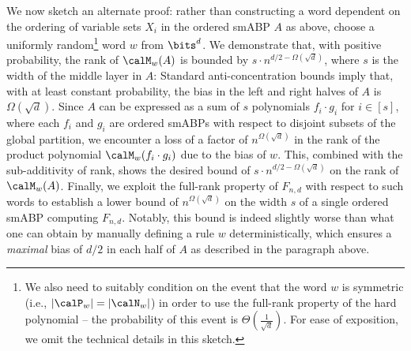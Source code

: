 \documentclass{article}
\begin{document}
We now sketch an alternate proof: rather than constructing a word dependent on the ordering of variable sets $X_i$ in the ordered smABP $A$ as above, choose a uniformly random\footnote{\label{fn:condition}We also need to suitably condition on 
the event that the word $w$ is symmetric (i.e., $|\calP_w| = |\calN_w|$) in order to use the full-rank property of the hard polynomial -- the probability of this event is $\Theta(\frac{1}{\sqrt{d}})$. For ease of exposition, we omit the technical details in this sketch.} word $w$ from $\bits^d$. We demonstrate that, with positive probability, the rank of $\calM_w(A)$ is bounded by $s \cdot n^{d/2-\Omega(\sqrt{d})}$, where $s$ is the width of the middle layer in $A$: Standard anti-concentration bounds imply that, with at least constant probability, the bias in the left and right halves of $A$ is $\Omega(\sqrt{d})$. Since $A$ can be expressed as a sum of $s$ polynomials $f_i\cdot g_i$ for $i\in[s]$, where each $f_i$ and $g_i$ are ordered smABPs with respect to disjoint subsets of the global partition, we encounter a loss of a factor of $n^{\Omega(\sqrt{d})}$ in the rank of the product polynomial $\calM_w(f_i\cdot g_i)$ due to the bias of $w$. This, combined with the sub-additivity of rank, shows the desired bound of $s \cdot n^{d/2-\Omega(\sqrt{d})}$ on the rank of $\calM_w(A)$. Finally, we exploit the full-rank property of $F_{n,d}$ with respect to such words to establish a lower bound of $n^{\Omega(\sqrt{d})}$ on the width $s$ of a single ordered smABP computing $F_{n,d}$. Notably, this bound is indeed slightly worse than what one can obtain by manually defining a rule $w$ deterministically, which ensures a \emph{maximal} bias of $d/2$ in each half of $A$ as described in the paragraph above.
\end{document}
